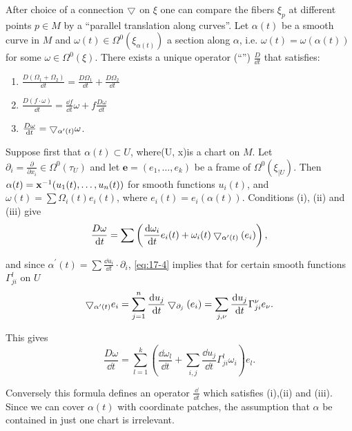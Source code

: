 \begin{remark}\label{remark:17-4}
After choice of a connection $\bigtriangledown$ on $\xi$ one can compare the fibers ${\xi }_{p}$ at different 
points $p \in  M$ by a ``parallel translation along curves''. Let $\alpha (t)$ be a smooth curve in $M$ 
and $\omega (t)  \in  \Omega^0( {\xi }_{\alpha (t) })$ a section along $\alpha$, 
i.e. $\omega (t)  = \omega ( {\alpha (t) })$ for some $\omega  \in  \Omega^0(\xi)$. There exists a unique 
operator (``'') $\frac{D}{\dd t}$ that satisfies:
\begin{enumerate} 
  \item $\frac{D( {\Omega_1 + \Omega_{2}}) }{\dd t} = \frac{D\Omega_1}{\dd t} + \frac{D\Omega_{2}}{\dd t}$
  \item $\frac{D( {f \cdot  \omega }) }{\dd t} = \frac{\dd f}{\dd t}\omega  + f\frac{D\omega }{\dd t}$
  \item $\frac{D\omega }{\dd t} = \btd_{{\alpha }^{\prime }(t) }\omega$.
\end{enumerate}

Suppose first that $\alpha (t)  \subset  U$, where(U, x)is a chart on $M$. 
Let ${\partial }_{i} = \frac{\partial }{\partial x_{i}} \in  \Omega^0( {\tau }_{U})$ and 
let $\mathbf{e} = ( {{e}_1,\ldots,{e}_{k}})$ be a frame of $\Omega^0( {\xi }_{\mid U})$. 
Then $\alpha (t)  = \mathbf{x}^{-1}( {{u}_1(t),\ldots,{u}_{n}(t) })$ for smooth functions ${u}_{i}(t)$, 
and $\omega (t)  = \sum \Omega_{i}(t) {e}_{i}(t)$, where ${e}_{i}(t)  = {e}_{i}( {\alpha (t) })$. 
Conditions (i), (ii) and (iii) give
\[
  \frac{D\omega }{\dd t} 
    = \sum \left( {\frac{\dd\omega_{i}}{\dd t}{e}_{i}(t)  
      + \omega_{i}(t) \btd_{{\alpha }^{\prime }(t) }( {e}_{i}) }\right),
\]

and since ${\alpha }^{\prime }(t)  = \sum \frac{\dd{u}_{i}}{\dd t} \cdot  {\partial }_{i}$, \eqref{eq:17-4} implies 
that for certain smooth functions ${\Gamma}_{ji}^{l}$ on $U$
\[
  \btd_{{\alpha }^{\prime }(t) }{e}_{i} 
  = \sum_{{j = 1}}^{n}\frac{\dd{u}_{j}}{\dd t}\btd_{{\partial }_{j}}( {e}_{i})  
  = \sum_{{j,\nu }}\frac{\dd{u}_{j}}{\dd t}{\Gamma }_{ji}^{\nu }{e}_{\nu }.
\]

This gives
\[
  \frac{D\omega }{\dd t} 
  = \sum_{{l = 1}}^{k}\left( {\frac{\dd \omega_{l}}{\dd t} + \sum_{{i,j}}\frac{\dd {u}_{j}}{\dd t}{\Gamma }_{ji}^{l}\omega_{i}}\right) {e}_{l}.
\]

Conversely this formula defines an operator $\frac\dd{\dd t}$ which satisfies (i),(ii) and (iii). Since we can 
cover $\alpha (t)$ with coordinate patches, the assumption that $\alpha$ be contained in just one chart 
is irrelevant. 
\end{remark}

